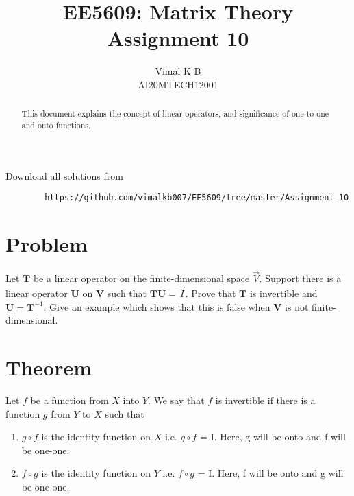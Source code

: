 \documentclass[journal,12pt,twocolumn]{IEEEtran}
\begin{document}
	\def\rightbox#1{\makebox[0in][r]{#1}}
	\def\centbox#1{\makebox[0in]{#1}}
	\def\topbox#1{\raisebox{-\baselineskip}[0in][0in]{#1}}
	\def\midbox#1{\raisebox{-0.5\baselineskip}[0in][0in]{#1}}
	\vspace{3cm}
	\title{EE5609: Matrix Theory\\
		Assignment 10\\}
	\author{Vimal K B\\
		AI20MTECH12001}
	\maketitle
	\newpage
	\bigskip
	\renewcommand{\thefigure}{\theenumi}
	\renewcommand{\thetable}{\theenumi}
	\begin{abstract}
		This document explains the concept of linear operators, and significance of one-to-one and onto functions.
	\end{abstract}
	Download all solutions from 
	\begin{lstlisting}
		https://github.com/vimalkb007/EE5609/tree/master/Assignment_10
	\end{lstlisting}
	\section{Problem}
	Let $\mathbf{T}$ be a linear operator on the finite-dimensional space $\vec{V}$. Support there is a linear operator $\mathbf{U}$ on $\mathbf{V}$ such that $\mathbf{TU} = \vec{I}$. Prove that $\mathbf{T}$ is invertible and $\mathbf{U} = \mathbf{T}^{-1}$. Give an example which shows that this is false when $\mathbf{V}$ is not finite-dimensional.
	
	
	\section{Theorem}
	
	\begin{theorem}\label{thm1}
		Let $f$ be a function from $X$ into $Y$. We say that $f$ is invertible if there is a function $g$ from $Y$ to $X$ such that
		\begin{enumerate}
			\item $g \circ f$ is the identity function on $X$ i.e. $g \circ f$ = I. Here, g will be onto and f will be one-one.
			\item $f \circ g$ is the identity function on $Y$ i.e. $f \circ g$ = I. Here, f will be onto and g will be one-one.
		\end{enumerate}
	\end{theorem}
	
\end{document}

